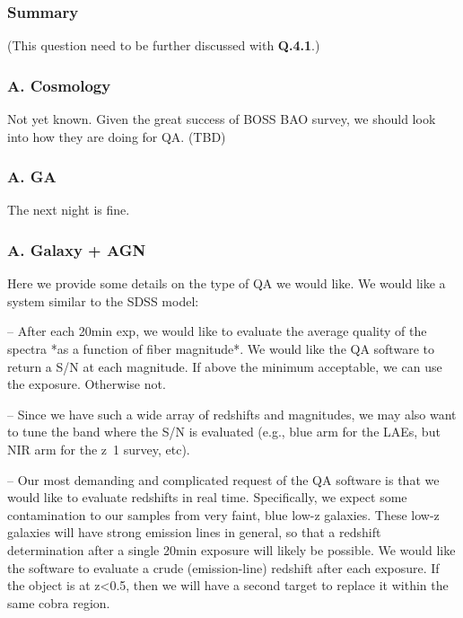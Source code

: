\documentclass[a4paper,notitlepage]{article}
\begin{document}
\subsubsection{Summary}

(This question need to be further discussed with {\bf Q.4.1}.)


\subsubsection{A. Cosmology}
Not yet known. Given the great success of BOSS BAO survey, we
should look into how they are doing for QA. (TBD)


\subsubsection{A. GA}
The next night is fine. 

\subsubsection{A. Galaxy + AGN}
Here we provide some details on the type of QA we would like. 
We would like a system similar to the SDSS model:

-- After each 20min exp, we would like to evaluate the average 
quality of the spectra *as a function of fiber magnitude*.  We would like the 
QA software to return a S/N at each magnitude. If above the minimum 
acceptable, we can use the exposure.  Otherwise not.

-- Since we have such a wide array of redshifts and magnitudes, we may 
also want to tune the band where the S/N is evaluated (e.g., blue arm for 
the LAEs, but NIR arm for the z~1 survey, etc).

-- Our most demanding and complicated request of the QA software 
is that we would like to evaluate redshifts in real time.  Specifically, 
we expect some contamination to our samples from very faint, blue 
low-z galaxies.  These low-z galaxies will have strong emission lines 
in general, so that a redshift determination after a single 20min 
exposure will likely be possible.  We would like the software to 
evaluate a crude (emission-line) redshift after each exposure.  If 
the object is at z<0.5, then we will have a second target to replace 
it within the same cobra region.



\renewcommand{\thesubsection}{Q.4.0-\alph{subsection}}
\setcounter{subsection}{0}
\end{document}

